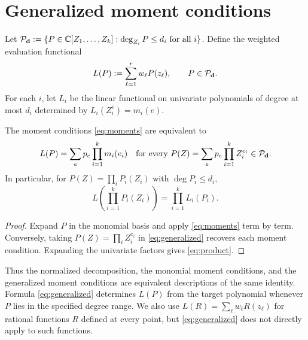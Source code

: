 \section{Generalized moment conditions}\label{sec:generalized}

Let $\mathcal P_{\mathbf d}:=\{P\in\mathbb C[Z_1,\ldots,Z_k]:\deg_{Z_i}P\le d_i
\text{ for all }i\}$. Define the weighted evaluation functional
\begin{equation}\label{eq:L}
L(P):=\sum_{\ell=1}^r w_\ell P(z_\ell),
\qquad P\in\mathcal P_{\mathbf d}.
\end{equation}
For each $i$, let $L_i$ be the linear functional on univariate
polynomials of degree at most $d_i$ determined by $L_i(Z_i^e)=m_i(e)$.

\begin{lemma}\label{lem:generalized}
The moment conditions \eqref{eq:moments} are equivalent to
\begin{equation}\label{eq:generalized}
L(P)=\sum_e p_e\prod_{i=1}^k m_i(e_i)
\quad\text{for every }P(Z)=\sum_e p_e\prod_{i=1}^k Z_i^{e_i}
\in\mathcal P_{\mathbf d}.
\end{equation}
In particular, for $P(Z)=\prod_iP_i(Z_i)$ with $\deg P_i\le d_i$,
\begin{equation}\label{eq:product}
L\!\left(\prod_{i=1}^kP_i(Z_i)\right)=\prod_{i=1}^kL_i(P_i).
\end{equation}
\end{lemma}
\begin{proof}
Expand $P$ in the monomial basis and apply \eqref{eq:moments} term by
term. Conversely, taking $P(Z)=\prod_iZ_i^{e_i}$ in
\eqref{eq:generalized} recovers each moment condition. Expanding the
univariate factors gives \eqref{eq:product}.
\end{proof}

Thus the normalized decomposition, the monomial moment conditions,
and the generalized moment conditions are equivalent descriptions
of the same identity. Formula \eqref{eq:generalized} determines $L(P)$
from the target polynomial whenever $P$ lies in the specified degree
range. We also use $L(R)=\sum_\ell w_\ell R(z_\ell)$ for rational
functions $R$ defined at every point, but \eqref{eq:generalized} does
not directly apply to such functions.
